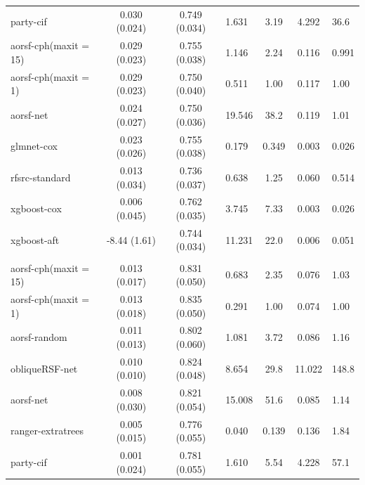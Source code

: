 \documentclass[twoside,11pt]{article}\usepackage[]{graphicx}\usepackage[]{color}
\newenvironment{knitrout}{}{} %
\begin{document}
\begin{knitrout}
\begin{longtable}{lcclccl}
\hspace{1em}party-cif & 0.030 (0.024) & 0.749 (0.034) & 1.631 & 3.19 & 4.292 & 36.6\\
\hspace{1em}aorsf-cph(maxit = 15) & 0.029 (0.023) & 0.755 (0.038) & 1.146 & 2.24 & 0.116 & 0.991\\
\hspace{1em}aorsf-cph(maxit = 1) & 0.029 (0.023) & 0.750 (0.040) & 0.511 & 1.00 & 0.117 & 1.00\\
\hspace{1em}aorsf-net & 0.024 (0.027) & 0.750 (0.036) & 19.546 & 38.2 & 0.119 & 1.01\\
\hspace{1em}glmnet-cox & 0.023 (0.026) & 0.755 (0.038) & 0.179 & 0.349 & 0.003 & 0.026\\
\hspace{1em}rfsrc-standard & 0.013 (0.034) & 0.736 (0.037) & 0.638 & 1.25 & 0.060 & 0.514\\
\hspace{1em}xgboost-cox & 0.006 (0.045) & 0.762 (0.035) & 3.745 & 7.33 & 0.003 & 0.026\\
\hspace{1em}xgboost-aft & -8.44 (1.61) & 0.744 (0.034) & 11.231 & 22.0 & 0.006 & 0.051\\
\addlinespace[0.3em]
\hline
\multicolumn{7}{l}{\textit{\textbf{ACTG 320; death, n = 1151, p = 12}}}\\
\hline
\hspace{1em}aorsf-cph(maxit = 15) & 0.013 (0.017) & 0.831 (0.050) & 0.683 & 2.35 & 0.076 & 1.03\\
\hspace{1em}aorsf-cph(maxit = 1) & 0.013 (0.018) & 0.835 (0.050) & 0.291 & 1.00 & 0.074 & 1.00\\
\hspace{1em}aorsf-random & 0.011 (0.013) & 0.802 (0.060) & 1.081 & 3.72 & 0.086 & 1.16\\
\hspace{1em}obliqueRSF-net & 0.010 (0.010) & 0.824 (0.048) & 8.654 & 29.8 & 11.022 & 148.8\\
\hspace{1em}aorsf-net & 0.008 (0.030) & 0.821 (0.054) & 15.008 & 51.6 & 0.085 & 1.14\\
\hspace{1em}ranger-extratrees & 0.005 (0.015) & 0.776 (0.055) & 0.040 & 0.139 & 0.136 & 1.84\\
\hspace{1em}party-cif & 0.001 (0.024) & 0.781 (0.055) & 1.610 & 5.54 & 4.228 & 57.1\\

\end{longtable}
\end{knitrout}
\end{document}
